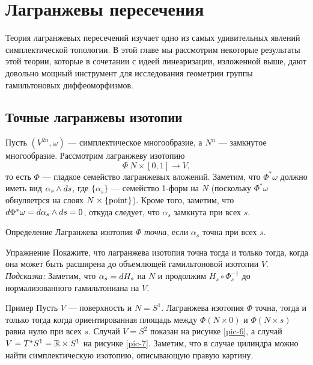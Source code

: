 \chapter{Лагранжевы пересечения}\label{chap:6}

Теория лагранжевых пересечений изучает одно из самых удивительных явлений симплектической топологии.
В этой главе мы рассмотрим некоторые результаты этой теории, которые в сочетании с идеей линеаризации, изложенной выше, дают довольно мощный инструмент для исследования геометрии группы гамильтоновых диффеоморфизмов.

\section{Точные лагранжевы изотопии}
Пусть $(V^{2n}, \omega)$ --- симплектическое многообразие, а $N^n$ ---
замкнутое многообразие. 
Рассмотрим лагранжеву изотопию
\[\Phi\: N \times [0, 1] \to V,\]
то есть $\Phi$ --- гладкое семейство лагранжевых вложений.
Заметим, что $\Phi^\ast \omega$ должно иметь вид $\alpha_s \wedge d
s$, где $\{\alpha_s\}$ --- семейство 1-форм на $N$ (поскольку
$\Phi^\ast \omega$ обнуляетрся на слоях $N \times \{\mathrm{point}\}$). 
Кроме того, заметим, что $d \Phi^\ast \omega = d \alpha_s \wedge d
s = 0$, откуда следует, что $\alpha_s$ замкнута при всех $s$. 

\begin{ex*}{Определение}
Лагранжева изотопия $\Phi$ \emph{точна}, если $\alpha_s$ точна при всех $s$.
\end{ex*}

\begin{ex}{Упражнение}\label{6.1.A}
Покажите, что лагранжева изотопия точна тогда и только тогда, когда
она может быть расширена до объемлющей гамильтоновой изотопии $V$. 
\emph{Подсказка:} Заметим, что $\alpha_s \z= \d  H_s$ на $N$ и продолжим $H_s
\circ \Phi^{-1}_s$ до нормализованного гамильтониана на $V$. 
\end{ex}

\begin{ex*}{Пример}
Пусть $V$ --- поверхность и $N = S^1$.
Лагранжева изотопия $\Phi$ точна, тогда и только тогда когда
ориентированная площадь между $\Phi (N \times {0})$ и $\Phi (N \times
{s})$ равна нулю при всех $s$. 
Случай $V = S^2$ показан на рисунке \ref{pic-6}, а  случай $V = T^\ast S^1 \z= \RR \times S^1$ на рисунке \ref{pic-7}.
Заметим, что в случае цилиндра можно найти симплектическую изотопию, описывающую правую картину.
\end{ex*}


